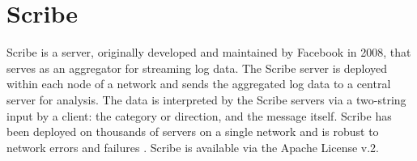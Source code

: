\section{Scribe}

Scribe is a server, originally developed and maintained by Facebook in 2008,
that serves as an aggregator for streaming log data. The Scribe server is
deployed within each node of a network and sends the aggregated log data to a
central server for analysis. The data is interpreted by the Scribe servers via a
two-string input by a client: the category or direction, and the message
itself. Scribe has been deployed on thousands of servers on a single network and
is robust to network errors and failures \cite{FBScribe}. Scribe is available
via the Apache License v.2.
